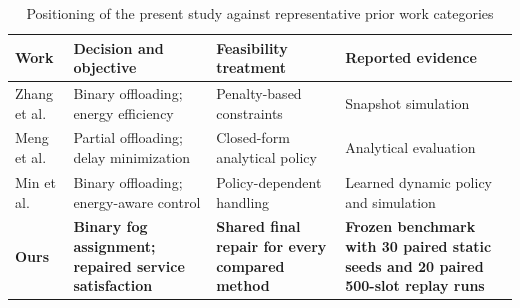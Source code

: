 \begin{table}[t]
\caption{Positioning of the present study against representative prior work categories}
\label{tab:related_work}
\centering
\small
\setlength{\tabcolsep}{3pt}
\begin{tabular}{p{}p{}p{}p{}}
\toprule
\textbf{Work} & \textbf{Decision and objective} & \textbf{Feasibility treatment} & \textbf{Reported evidence} \\
\midrule
Zhang et al. \cite{Zhang2016} & Binary offloading; energy efficiency & Penalty-based constraints & Snapshot simulation \\
Meng et al. \cite{Meng2019} & Partial offloading; delay minimization & Closed-form analytical policy & Analytical evaluation \\
Min et al. \cite{Min2019} & Binary offloading; energy-aware control & Policy-dependent handling & Learned dynamic policy and simulation \\
\textbf{Ours} & \textbf{Binary fog assignment; repaired service satisfaction} & \textbf{Shared final repair for every compared method} & \textbf{Frozen benchmark with 30 paired static seeds and 20 paired 500-slot replay runs} \\
\bottomrule
\end{tabular}
\end{table}
